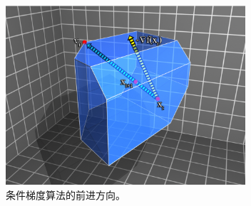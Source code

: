 \begin{figure}[h!]
\begin{center}
\includegraphics[width=3.5in]{figs/fig_fw2}
\end{center}
\caption{
    条件梯度算法的前进方向。
    \label{fig:OFW}}
\end{figure}

